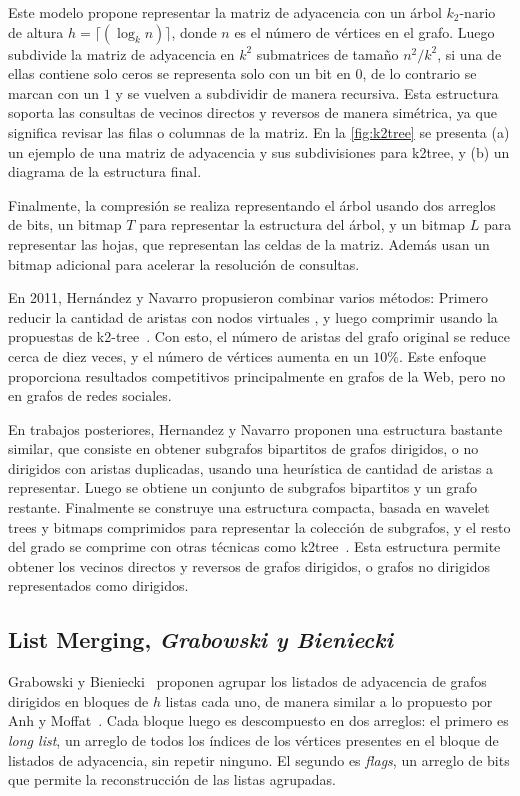 Este modelo propone representar la matriz de adyacencia con un árbol $k_{2}$-nario de altura $h=\lceil(\log_k n)\rceil$, donde $n$ es el número de vértices en el grafo. Luego subdivide la matriz de adyacencia en $k^2$ submatrices de tamaño $n^{2}/k^{2}$, si una de ellas contiene solo ceros se representa solo con un bit en $0$, de lo contrario se marcan con un $1$ y se vuelven a subdividir de manera recursiva. Esta estructura soporta las consultas de vecinos directos y reversos de manera simétrica, ya que significa revisar las filas o columnas de la matriz. En la \autoref{fig:k2tree} se presenta (a) un ejemplo de una matriz de adyacencia y sus subdivisiones para k2tree, y (b) un diagrama de la estructura final.



Finalmente, la compresión se realiza representando el árbol usando dos arreglos de bits, un bitmap $T$ para representar la estructura del árbol, y un bitmap $L$ para representar las hojas, que representan las celdas de la matriz. Además usan un bitmap adicional para acelerar la resolución de consultas. 

En 2011, Hernández y Navarro \cite{hernandez2011compression} propusieron combinar varios métodos: Primero reducir la cantidad de aristas con nodos virtuales \cite{BuehrerChellapilla},  y luego comprimir usando la propuestas de k2-tree~\cite{brisaboa2009k}. Con esto, el número de aristas del grafo original se reduce cerca de diez veces, y el número de vértices aumenta en un $10\%$. Este enfoque proporciona resultados competitivos principalmente en grafos de la Web, pero no en grafos de redes sociales.

En trabajos posteriores, Hernandez y Navarro \cite{hernandez2012compressed, hernandez2014compressed} proponen una estructura bastante similar, que consiste en obtener subgrafos bipartitos de grafos dirigidos, o no dirigidos con aristas duplicadas, usando una heurística de cantidad de aristas a representar. Luego se obtiene un conjunto de subgrafos bipartitos y un grafo restante. Finalmente se construye una estructura compacta, basada en wavelet trees y bitmaps comprimidos para representar la colección de subgrafos, y el resto del grado se comprime con otras técnicas como k2tree~\cite{brisaboa2009k}. Esta estructura permite obtener los vecinos directos y reversos de grafos dirigidos, o grafos no dirigidos representados como dirigidos.


\subsection{List Merging, \textit{Grabowski y Bieniecki}}
Grabowski y Bieniecki~\cite{grabowski2014tight} proponen agrupar los listados de adyacencia de grafos dirigidos en bloques de $h$ listas cada uno, de manera similar a lo propuesto por Anh y Moffat~\cite{anh2010local}. Cada bloque luego es descompuesto en dos arreglos: el primero es \textit{long list}, un arreglo de todos los índices de los vértices presentes en el bloque de listados de adyacencia, sin repetir ninguno. El segundo es \textit{flags}, un arreglo de bits que permite la reconstrucción de las listas agrupadas. 

